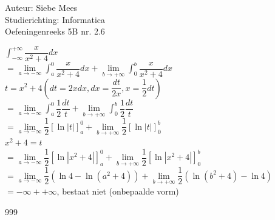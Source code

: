 \documentclass[a4paper]{article}
\begin{document}
  
\noindent \large Auteur: Siebe Mees \\
\noindent \large Studierichting: Informatica\\
\noindent \large Oefeningenreeks 5B nr. 2.6\\

\medskip

\normalsize

$ \displaystyle\int_{-\infty}^{+\infty} \dfrac{x}{x^2+4} dx $\\

$ = \lim\limits_{a \rightarrow -\infty} \displaystyle\int_a^0 \dfrac{x}{x^2+4} dx + \lim\limits_{b \rightarrow +\infty} \displaystyle\int_0^b \dfrac{x}{x^2+4} dx $\\

$ t = x^2+4 \left( dt = 2x dx,dx = \dfrac{dt}{2x},x = \dfrac{1}{2}dt \right) $\\

$ = \lim\limits_{a \rightarrow -\infty} \displaystyle\int_a^0 \dfrac{1}{2} \dfrac{dt}{t} + \lim\limits_{b \rightarrow +\infty} \displaystyle\int_0^b \dfrac{1}{2} \dfrac{dt}{t} $\\

$ = \lim\limits_{a \rightarrow -\infty} \dfrac{1}{2} \left[ \ln |t| \right]_a^0 + \lim\limits_{b \rightarrow +\infty} \dfrac{1}{2} \left[ \ln |t| \right]_0^b $\\

$ x^2+4 = t $\\

$ = \lim\limits_{a \rightarrow -\infty} \dfrac{1}{2} \left[ \ln |x^2+4| \right]_a^0 + \lim\limits_{b \rightarrow +\infty} \dfrac{1}{2} \left[ \ln |x^2+4| \right]_0^b $\\

$ = \lim\limits_{a \rightarrow -\infty} \dfrac{1}{2} \left( \ln 4 - \ln (a^2+4) \right) + \lim\limits_{b \rightarrow +\infty} \dfrac{1}{2} \left( \ln (b^2+4) - \ln 4 \right) $\\

$ = -\infty + +\infty$, bestaat niet (onbepaalde vorm)\\

\begin{thebibliography}{999}
\end{thebibliography}
\end{document}
